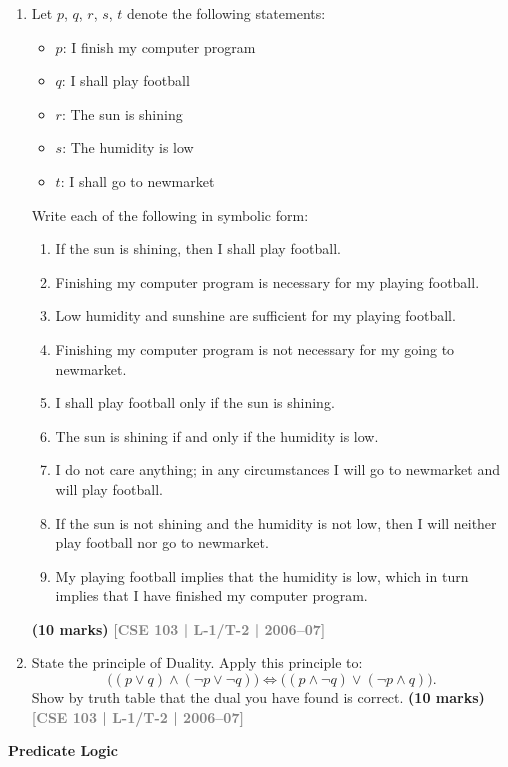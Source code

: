 \documentclass[12pt,a3paper]{article}
\newcommand{\yr}[1]{\hfill\textcolor{gray}{\small\textbf{[#1]}}}
\newcommand{\mk}[1]{\textcolor{orange!70!black}{\small\textbf{(#1 marks)}}}
\newcommand{\subtopic}[2]{%
  \vspace{10pt}
  \noindent\begin{tcolorbox}[colback=#1!8,colframe=#1,boxrule=0.6pt,arc=4pt,
    left=6pt,right=6pt,top=4pt,bottom=4pt]
    \small\bfseries\textcolor{#1}{#2}
  \end{tcolorbox}
  \vspace{2pt}
}
\begin{document}
\begin{enumerate}
\item Let $p$, $q$, $r$, $s$, $t$ denote the following statements:
\begin{itemize}[leftmargin=1.8em,itemsep=1pt,label={$\bullet$}]
  \item $p$: I finish my computer program
  \item $q$: I shall play football
  \item $r$: The sun is shining
  \item $s$: The humidity is low
  \item $t$: I shall go to newmarket
\end{itemize}
Write each of the following in symbolic form:
\begin{enumerate}
  \item If the sun is shining, then I shall play football.
  \item Finishing my computer program is necessary for my playing football.
  \item Low humidity and sunshine are sufficient for my playing football.
  \item Finishing my computer program is not necessary for my going to newmarket.
  \item I shall play football only if the sun is shining.
  \item The sun is shining if and only if the humidity is low.
  \item I do not care anything; in any circumstances I will go to newmarket and will play football.
  \item If the sun is not shining and the humidity is not low, then I will neither play football nor go to newmarket.
  \item My playing football implies that the humidity is low, which in turn implies that I have finished my computer program.
\end{enumerate}
\mk{10} \yr{CSE 103 | L-1/T-2 | 2006--07}

\item State the principle of Duality. Apply this principle to:
\[
  \bigl((p \lor q) \land (\lnot p \lor \lnot q)\bigr) \iff \bigl((p \land \lnot q) \lor (\lnot p \land q)\bigr).
\]
Show by truth table that the dual you have found is correct.
\mk{10} \yr{CSE 103 | L-1/T-2 | 2006--07}



\end{enumerate}

\subtopic{cA}{Predicate Logic}
\label{sub:s1-predlogic}
\end{document}
